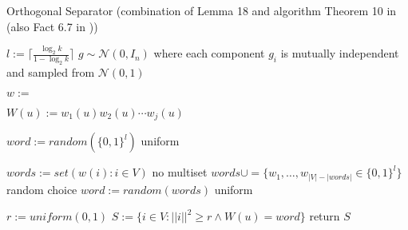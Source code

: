\begin{algorithm}[htpb]
	\caption{Orthogonal Separator (combination of Lemma 18 and algorithm Theorem 10 in \cite{LouisM14} (also Fact 6.7 in \cite{ChanLTZ16})) \label{alg:orthogonal_separator}} 
\begin{algorithmic}
	\State $l := \lceil \frac{\log_2 k}{1-\log_2 k}\rceil$
	\State $g \sim \mathcal{N} (0,I_n)$ where each component $g_i$ is mutually independent and sampled from $\mathcal{N} (0,1)$
	

	
	\State $w := $
	
	\State $W(u) := w_1(u)w_2(u)\cdots w_j(u)$
	\EndFor
	
	\State $word := random( \{0,1\}^l)$ uniform
	
	\Else
	 
	\State $words := set({w(i): i\in V})$  no multiset
	\State $words \cup= \{w_1, \ldots , w_{|V|-|words|} \in \{0,1\}^l\} $ random choice
	\State $word := random(words)$ uniform
	
	\EndIf
	
	\State $r := uniform(0,1)$
	\State $S := \{i \in V: ||i||^2 \ge r \land W(u) = word \}$
	\State return $S$
	
	\EndFunction %
\end{algorithmic}
\end{algorithm}	

	
	
